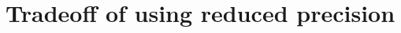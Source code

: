 \section{Tradeoff of using reduced precision}
\begin{comment}
- Pros
* smaller chip size
* energy saving
* faster computation
* lower storage space
- Cons
* Risk for lower accuracy
* Often requires manual effort to implement/convert
* overhead from casting can be greater than performance benefit
* new data format often require new type of hardware
\end{comment}
			

